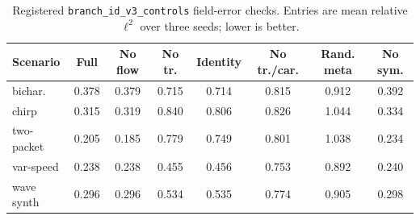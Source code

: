 \begin{table}[t]
\centering
\caption{Registered \texttt{branch\_id\_v3\_controls} field-error checks. Entries are mean relative $\ell^2$ over three seeds; lower is better.}
\label{tab:branchidv3controls}
\scriptsize
\begin{tabular}{lccccccc}
\toprule
Scenario & Full & No flow & No tr. & Identity & No tr./car. & Rand. meta & No sym. \\
\midrule
bichar. & 0.378 & 0.379 & 0.715 & 0.714 & 0.815 & 0.912 & 0.392 \\
chirp & 0.315 & 0.319 & 0.840 & 0.806 & 0.826 & 1.044 & 0.334 \\
two-packet & 0.205 & 0.185 & 0.779 & 0.749 & 0.801 & 1.038 & 0.234 \\
var-speed & 0.238 & 0.238 & 0.455 & 0.456 & 0.753 & 0.892 & 0.240 \\
wave synth & 0.296 & 0.296 & 0.534 & 0.535 & 0.774 & 0.905 & 0.298 \\
\bottomrule
\end{tabular}
\end{table}
